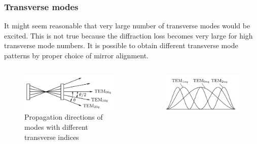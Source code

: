 \documentclass{beamer}
\begin{document}
	\begin{frame}
		\frametitle{Transverse modes}
		\footnotesize
		
		It might seem
		reasonable that very large number of transverse
		modes would be excited. This is not true
		because the diffraction loss becomes very large for
		high transverse mode numbers.
		It is possible to obtain different transverse mode patterns by proper
		choice of mirror alignment.
		\vspace{-10pt}
		\begin{columns}
			\footnotesize
			\begin{column}{0.4\textwidth}
				\begin{figure}
					\footnotesize
					\centering
					\includegraphics[width=1\linewidth]{res/tem_directions.png}
					\vspace{-5pt}
					\footnotesize
					\caption{\footnotesize Propagation directions of modes with different transverse indices}
				\end{figure}
			\end{column}
			\begin{column}{0.4\textwidth}
				\begin{figure}
					
					\centering
					\includegraphics[width=1\linewidth]{res/tem_intensity.png}		\vspace{-13pt}
					

\end{figure}
\end{column}
\end{columns}
\end{frame}
\end{document}
